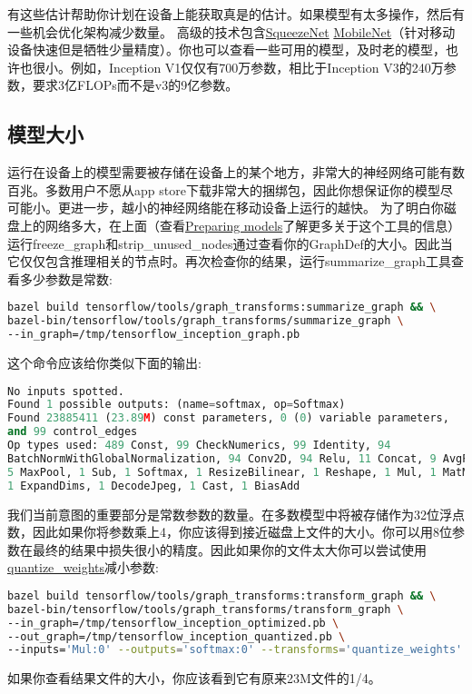 有这些估计帮助你计划在设备上能获取真是的估计。如果模型有太多操作，然后有一些机会优化架构减少数量。
高级的技术包含\href{https://arxiv.org/abs/1602.07360}{SqueezeNet} \href{https://arxiv.org/abs/1704.04861}{MobileNet}（针对移动设备快速但是牺牲少量精度）。你也可以查看一些可用的模型，及时老的模型，也许也很小。例如，Inception V1仅仅有700万参数，相比于Inception V3的240万参数，要求3亿FLOPs而不是v3的9亿参数。
\subsection{模型大小}
运行在设备上的模型需要被存储在设备上的某个地方，非常大的神经网络可能有数百兆。多数用户不愿从app store下载非常大的捆绑包，因此你想保证你的模型尽可能小。更进一步，越小的神经网络能在移动设备上运行的越快。
为了明白你磁盘上的网络多大，在上面（查看\href{https://www.tensorflow.org/mobile/prepare_models?hl=zh-cn}{Preparing models}了解更多关于这个工具的信息）运行freeze\_graph和strip\_unused\_nodes通过查看你的GraphDef的大小。因此当它仅仅包含推理相关的节点时。再次检查你的结果，运行summarize\_graph工具查看多少参数是常数:
\begin{lstlisting}[language=Bash]
bazel build tensorflow/tools/graph_transforms:summarize_graph && \
bazel-bin/tensorflow/tools/graph_transforms/summarize_graph \
--in_graph=/tmp/tensorflow_inception_graph.pb
\end{lstlisting}
这个命令应该给你类似下面的输出:
\begin{lstlisting}[language=Python]
No inputs spotted.
Found 1 possible outputs: (name=softmax, op=Softmax)
Found 23885411 (23.89M) const parameters, 0 (0) variable parameters,
and 99 control_edges
Op types used: 489 Const, 99 CheckNumerics, 99 Identity, 94
BatchNormWithGlobalNormalization, 94 Conv2D, 94 Relu, 11 Concat, 9 AvgPool,
5 MaxPool, 1 Sub, 1 Softmax, 1 ResizeBilinear, 1 Reshape, 1 Mul, 1 MatMul,
1 ExpandDims, 1 DecodeJpeg, 1 Cast, 1 BiasAdd 
\end{lstlisting}
我们当前意图的重要部分是常数参数的数量。在多数模型中将被存储作为32位浮点数，因此如果你将参数乘上4，你应该得到接近磁盘上文件的大小。你可以用8位参数在最终的结果中损失很小的精度。因此如果你的文件太大你可以尝试使用\href{https://www.tensorflow.org/performance/quantization?hl=zh-cn}{quantize\_weights}减小参数:
\begin{lstlisting}[language=Bash]
bazel build tensorflow/tools/graph_transforms:transform_graph && \
bazel-bin/tensorflow/tools/graph_transforms/transform_graph \
--in_graph=/tmp/tensorflow_inception_optimized.pb \
--out_graph=/tmp/tensorflow_inception_quantized.pb \
--inputs='Mul:0' --outputs='softmax:0' --transforms='quantize_weights'
\end{lstlisting}
如果你查看结果文件的大小，你应该看到它有原来23M文件的1/4。


